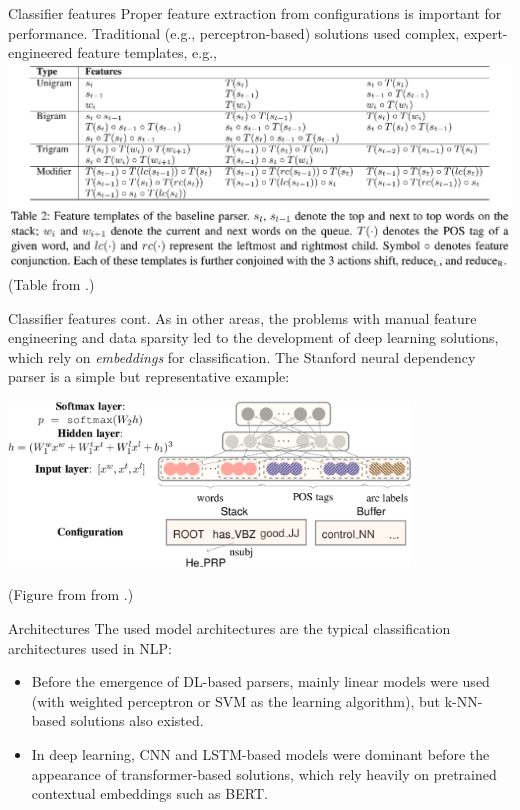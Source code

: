 \documentclass[style=upen, size=14pt]{powerdot}
\theoremstyle{definition}
\begin{document}
\begin{slide}[toc=Features]{Classifier features}
  Proper feature extraction from configurations is important for performance.
  Traditional (e.g., perceptron-based) solutions used complex, expert-engineered
  feature templates, e.g.,
  \includegraphics[width=1.\textwidth]{figures/trans_dep_features.eps}\\
  \footnotesize{\hspace{3.4cm}(Table from \cite{huang2009bilingually}.)}
\end{slide}

\begin{slide}[toc=]{Classifier features cont.}
  As in other areas, the problems with manual feature engineering and data
  sparsity led to the development of deep learning solutions, which rely on
  \emph{embeddings} for classification. The Stanford neural dependency parser is
  a simple but representative example:
  \begin{center}
    \includegraphics[width=0.8\textwidth]{figures/trans_dep_neural.eps}
    
    \footnotesize{(Figure from  from \cite{chen2014fast}.)}
  \end{center}
\end{slide}

\begin{slide}[toc=]{Architectures}
  The used model architectures are the typical classification architectures used
  in NLP:
  \begin{itemize}
  \item Before the emergence of DL-based parsers, mainly linear models were used
    (with weighted perceptron or SVM as the learning algorithm), but k-NN-based
    solutions also existed.
  \item In deep learning, CNN and LSTM-based models were dominant before the
    appearance of transformer-based solutions, which rely heavily on pretrained
    contextual embeddings such as BERT.
  \end{itemize}
\end{slide}
\end{document}
